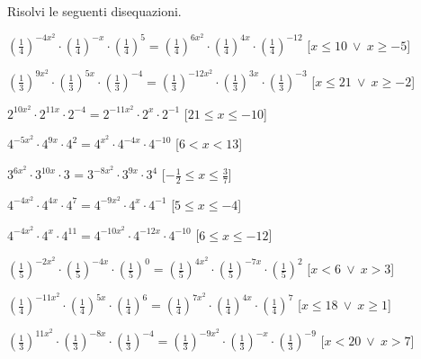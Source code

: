 \begin{esercizio}\label{ese:}
 Risolvi le seguenti disequazioni.
 \begin{enumeratea}
  \item  \(\left(\frac{1}{4}\right)^{-4x^2} \cdot \left(\frac{1}{4}\right)^{-x} 
\cdot \left(\frac{1}{4}\right)^{5} = \left(\frac{1}{4}\right)^{6x^2} \cdot 
\left(\frac{1}{4}\right)^{4x} \cdot \left(\frac{1}{4}\right)^{-12}\)
   \hfill [\(x \leqslant 10~\vee~x \geqslant -5\)]
  \item  \(\left(\frac{1}{3}\right)^{9x^2} \cdot \left(\frac{1}{3}\right)^{5x} 
\cdot \left(\frac{1}{3}\right)^{-4} = \left(\frac{1}{3}\right)^{-12x^2} \cdot 
\left(\frac{1}{3}\right)^{3x} \cdot \left(\frac{1}{3}\right)^{-3}\)
   \hfill [\(x \leqslant 21~\vee~x \geqslant -2\)]
  \item  \(2^{10x^2} \cdot 2^{11x} \cdot 2^{-4} = 2^{-11x^2} \cdot 2^{x} \cdot 
2^{-1}\)
   \hfill [\(21 \leqslant x \leqslant -10\)]
  \item  \(4^{-5x^2} \cdot 4^{9x} \cdot 4^{2} = 4^{x^2} \cdot 4^{-4x} \cdot 
4^{-10}\)
   \hfill [\(6 < x < 13\)]
  \item  \(3^{6x^2} \cdot 3^{10x} \cdot 3^{} = 3^{-8x^2} \cdot 3^{9x} \cdot 
3^{4}\)
   \hfill [\(-\frac{1}{2} \leqslant x \leqslant \frac{3}{7}\)]
  \item  \(4^{-4x^2} \cdot 4^{4x} \cdot 4^{7} = 4^{-9x^2} \cdot 4^{x} \cdot 
4^{-1}\)
   \hfill [\(5 \leqslant x \leqslant -4\)]
  \item  \(4^{-4x^2} \cdot 4^{x} \cdot 4^{11} = 4^{-10x^2} \cdot 4^{-12x} \cdot 
4^{-10}\)
   \hfill [\(6 \leqslant x \leqslant -12\)]
  \item  \(\left(\frac{1}{5}\right)^{-2x^2} \cdot 
\left(\frac{1}{5}\right)^{-4x} \cdot \left(\frac{1}{5}\right)^{0} = 
\left(\frac{1}{5}\right)^{4x^2} \cdot \left(\frac{1}{5}\right)^{-7x} \cdot 
\left(\frac{1}{5}\right)^{2}\)
   \hfill [\(x < 6~\vee~x > 3\)]
  \item  \(\left(\frac{1}{4}\right)^{-11x^2} \cdot 
\left(\frac{1}{4}\right)^{5x} \cdot \left(\frac{1}{4}\right)^{6} = 
\left(\frac{1}{4}\right)^{7x^2} \cdot \left(\frac{1}{4}\right)^{4x} \cdot 
\left(\frac{1}{4}\right)^{7}\)
   \hfill [\(x \leqslant 18~\vee~x \geqslant 1\)]
  \item  \(\left(\frac{1}{3}\right)^{11x^2} \cdot 
\left(\frac{1}{3}\right)^{-8x} \cdot \left(\frac{1}{3}\right)^{-4} = 
\left(\frac{1}{3}\right)^{-9x^2} \cdot \left(\frac{1}{3}\right)^{-x} \cdot 
\left(\frac{1}{3}\right)^{-9}\)
   \hfill [\(x < 20~\vee~x > 7\)]

\end{enumeratea}
\end{esercizio}
